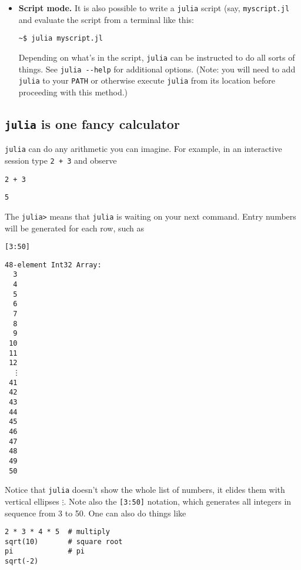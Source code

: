 \documentclass[11pt]{article}
\begin{document}
\begin{itemize}
\item \textbf{Script mode.} It is also possible to write a \texttt{julia} script (say, \texttt{myscript.jl} and evaluate the script from a terminal like this:

\begin{verbatim}
~$ julia myscript.jl
\end{verbatim}

Depending on what's in the script, \texttt{julia} can be instructed to do
all sorts of things.  See \texttt{julia -{}-help} for additional
options. (Note: you will need to add \texttt{julia} to your \texttt{PATH} or
otherwise execute \texttt{julia} from its location before proceeding with
this method.)
\end{itemize}
\subsection[\texttt{julia} is one fancy calculator]{\texttt{julia} is one fancy calculator}
\label{sec-2-2}

\texttt{julia} can do any arithmetic you can imagine. For example, in an
interactive session type \texttt{2 + 3} and observe

\begin{verbatim}
2 + 3
\end{verbatim}

\begin{verbatim}
5
\end{verbatim}

The \texttt{julia>} means that \texttt{julia} is waiting on your next command. Entry
numbers will be generated for each row, such as

\begin{verbatim}
[3:50]
\end{verbatim}

\begin{verbatim}
48-element Int32 Array:
  3
  4
  5
  6
  7
  8
  9
 10
 11
 12
  ⋮
 41
 42
 43
 44
 45
 46
 47
 48
 49
 50
\end{verbatim}

Notice that \texttt{julia} doesn't show the whole list of numbers, it elides
them with vertical ellipses \(\vdots\). Note also the \texttt{[3:50]}
notation, which generates all integers in sequence from 3 to 50. One
can also do things like

\begin{verbatim}
2 * 3 * 4 * 5  # multiply
sqrt(10)       # square root
pi             # pi
sqrt(-2)
\end{verbatim}
\end{document}
